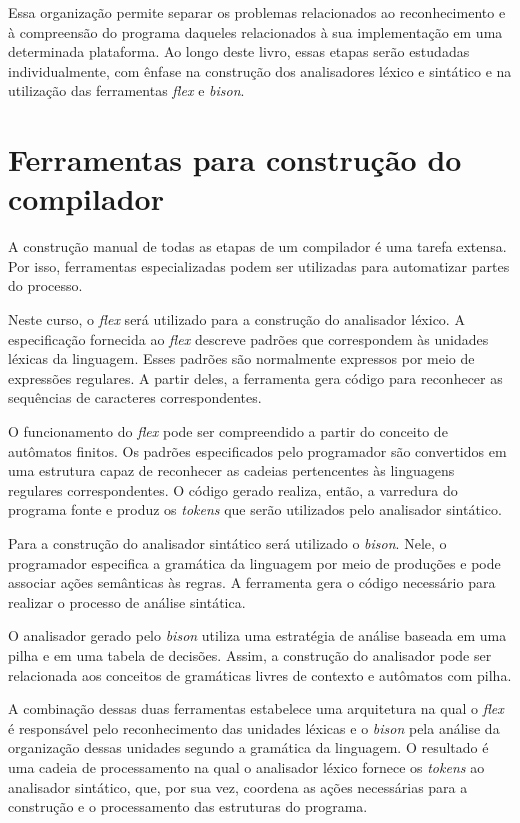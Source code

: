 \documentclass[
  brazilian,
  letterpaper,
]{book}
\theoremstyle{plain}
\theoremstyle{definition}
\theoremstyle{remark}
\begin{document}
Essa organização permite separar os problemas relacionados ao
reconhecimento e à compreensão do programa daqueles relacionados à sua
implementação em uma determinada plataforma. Ao longo deste livro, essas
etapas serão estudadas individualmente, com ênfase na construção dos
analisadores léxico e sintático e na utilização das ferramentas
\emph{flex} e \emph{bison}.

\section{Ferramentas para construção do
compilador}\label{ferramentas-para-construuxe7uxe3o-do-compilador}

A construção manual de todas as etapas de um compilador é uma tarefa
extensa. Por isso, ferramentas especializadas podem ser utilizadas para
automatizar partes do processo.

Neste curso, o \emph{flex} será utilizado para a construção do
analisador léxico. A especificação fornecida ao \emph{flex} descreve
padrões que correspondem às unidades léxicas da linguagem. Esses padrões
são normalmente expressos por meio de expressões regulares. A partir
deles, a ferramenta gera código para reconhecer as sequências de
caracteres correspondentes.

O funcionamento do \emph{flex} pode ser compreendido a partir do
conceito de autômatos finitos. Os padrões especificados pelo programador
são convertidos em uma estrutura capaz de reconhecer as cadeias
pertencentes às linguagens regulares correspondentes. O código gerado
realiza, então, a varredura do programa fonte e produz os \emph{tokens}
que serão utilizados pelo analisador sintático.

Para a construção do analisador sintático será utilizado o \emph{bison}.
Nele, o programador especifica a gramática da linguagem por meio de
produções e pode associar ações semânticas às regras. A ferramenta gera
o código necessário para realizar o processo de análise sintática.

O analisador gerado pelo \emph{bison} utiliza uma estratégia de análise
baseada em uma pilha e em uma tabela de decisões. Assim, a construção do
analisador pode ser relacionada aos conceitos de gramáticas livres de
contexto e autômatos com pilha.

A combinação dessas duas ferramentas estabelece uma arquitetura na qual
o \emph{flex} é responsável pelo reconhecimento das unidades léxicas e o
\emph{bison} pela análise da organização dessas unidades segundo a
gramática da linguagem. O resultado é uma cadeia de processamento na
qual o analisador léxico fornece os \emph{tokens} ao analisador
sintático, que, por sua vez, coordena as ações necessárias para a
construção e o processamento das estruturas do programa.
\end{document}
